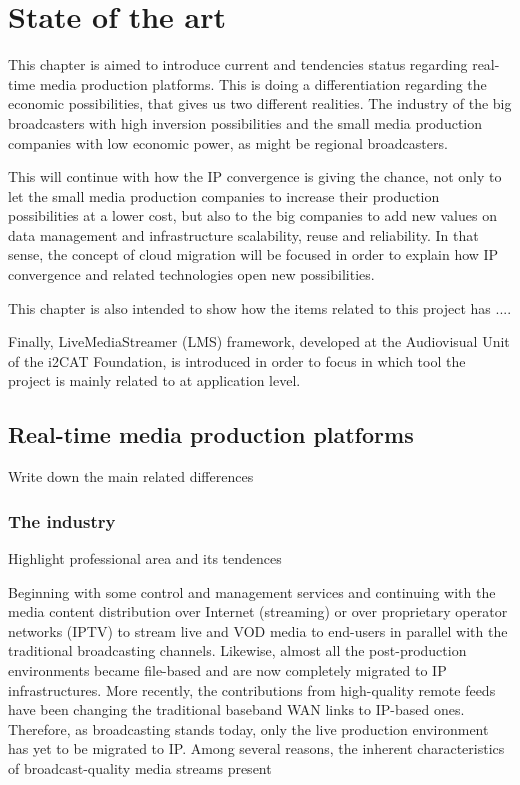 \chapter{State of the art}\label{A:stateOfTheArt}

This chapter is aimed to introduce current and tendencies status regarding real-time media production platforms. This is doing a differentiation regarding the economic possibilities, that gives us two different realities. The industry of the big broadcasters with high inversion possibilities and the small media production companies with low economic power, as might be regional broadcasters.

This will continue with how the IP convergence is giving the chance, not only to let the small media production companies to increase their production possibilities at a lower cost, but also to the big companies to add new values on data management and infrastructure scalability, reuse and reliability. In that sense, the concept of cloud migration will be focused in order to explain how IP convergence and related technologies open new possibilities.

This chapter is also intended to show how the items related to this project has ....

Finally, LiveMediaStreamer (LMS) framework, developed at the Audiovisual Unit of the i2CAT Foundation, is introduced in order to focus in which tool the project is mainly related to at application level.

\section{Real-time media production platforms}

Write down the main related differences

\subsection{The industry}

Highlight professional area and its tendences



Beginning with some control and management services and continuing with the media content
distribution over Internet (streaming) or over proprietary operator networks (IPTV) to stream live and
VOD media to end-users in parallel with the traditional broadcasting channels. Likewise, almost all
the post-production environments became file-based and are now completely migrated to IP
infrastructures. More recently, the contributions from high-quality remote feeds have been changing
the traditional baseband WAN links to IP-based ones.
Therefore, as broadcasting stands today, only the live production environment has yet to be migrated
to IP. Among several reasons, the inherent characteristics of broadcast-quality media streams present

